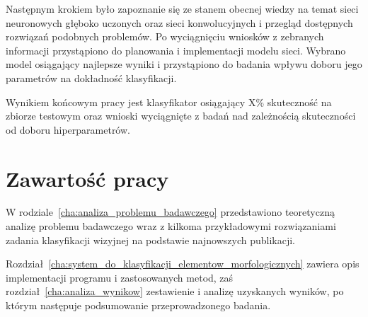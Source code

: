 {\parindent0pt %
Następnym krokiem było zapoznanie się ze stanem obecnej wiedzy na temat sieci neuronowych głęboko uczonych oraz sieci konwolucyjnych i przegląd dostępnych rozwiązań podobnych problemów. Po wyciągnięciu wniosków z zebranych informacji przystąpiono do planowania i implementacji modelu sieci. Wybrano model osiągający najlepsze wyniki i przystąpiono do badania wpływu doboru jego parametrów na dokładność klasyfikacji.

Wynikiem końcowym pracy jest klasyfikator osiągający X\% skuteczność na zbiorze testowym oraz wnioski wyciągnięte z badań nad zależnością skuteczności od doboru hiperparametrów.
}
\section{Zawartość pracy}
\label{sec:zawartosc_pracy}

W rodziale~\ref{cha:analiza_problemu_badawczego} przedstawiono teoretyczną analizę problemu badawczego wraz z kilkoma przykładowymi rozwiązaniami zadania klasyfikacji wizyjnej na podstawie najnowszych publikacji. 

{\parindent0pt %
Rozdział~\ref{cha:system_do_klasyfikacji_elementow_morfologicznych} zawiera opis implementacji programu i zastosowanych metod, zaś rozdział~\ref{cha:analiza_wynikow} zestawienie i analizę uzyskanych wyników, po którym następuje podsumowanie przeprowadzonego badania.
}